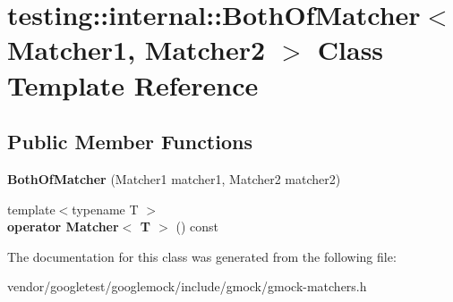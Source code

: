 \hypertarget{classtesting_1_1internal_1_1_both_of_matcher}{}\section{testing\+:\+:internal\+:\+:Both\+Of\+Matcher$<$ Matcher1, Matcher2 $>$ Class Template Reference}
\label{classtesting_1_1internal_1_1_both_of_matcher}
\subsection*{Public Member Functions}
\begin{DoxyCompactItemize}
\item 
\mbox{\label{classtesting_1_1internal_1_1_both_of_matcher_ab7941deda1965521f72d58b0dd429d6a}} 
{\bfseries Both\+Of\+Matcher} (Matcher1 matcher1, Matcher2 matcher2)
\item 
\mbox{\label{classtesting_1_1internal_1_1_both_of_matcher_a5846390364b763fbe31fb11f8c2e3180}} 
{\footnotesize template$<$typename T $>$ }\\{\bfseries operator Matcher$<$ T $>$} () const
\end{DoxyCompactItemize}


The documentation for this class was generated from the following file\+:\begin{DoxyCompactItemize}
\item 
vendor/googletest/googlemock/include/gmock/gmock-\/matchers.\+h\end{DoxyCompactItemize}
